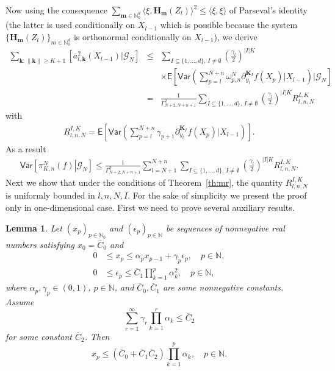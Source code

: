 \documentclass[bj]{imsart}
\newtheorem{lem}[thm]{Lemma}
\newcommand*{\ol}{\overline}
\begin{document}
Now using the consequence
$\sum_{\mathbf{m}\in \mathbb{N}^d_0} \langle\xi,\mathbf{H}_\mathbf{m}(Z_l)\rangle^2\le\langle\xi,\xi\rangle$
of Parseval's identity
(the latter is used conditionally on $X_{l-1}$
which is possible because the system
$\{\mathbf{H}_\mathbf{m}(Z_l)\}_{m\in \mathbb{N}^d_0}$
is orthonormal conditionally on $X_{l-1}$),
we derive
\begin{eqnarray*}
\sum_{\mathbf{k}\colon\|\mathbf{k}\|\geq K+1}\left[\bar{a}_{l,\mathbf{k}}^{2}(X_{l-1})|\mathcal{G}_{N}\right]
&\leq & \sum_{I\subseteq\{1,\ldots,d\},\, I\neq \emptyset}
\left(\frac{\gamma_{l}}{2}\right)^{|I|K}
\\
&& \times\mathsf E\left[
\mathsf{Var}\left(\sum_{p=l}^{N+n}\omega_{p,n}^{N}\partial_{y_{l}}^{\mathbf{K}_I}f\left(X_{p}\right)
\Big|X_{l-1}\right)
\Bigg|\mathcal G_N\right]
\\
&=& \frac{1}{\Gamma^2_{N+2,N+n+1}}\sum_{I\subseteq\{1,\ldots,d\},\, I\neq \emptyset}
\left(\frac{\gamma_{l}}{2}\right)^{|I|K}
R_{l,n,N}^{I,K}
\end{eqnarray*}
with
\begin{eqnarray*}
R_{l,n,N}^{I,K}=\mathsf E\left[
\mathsf{Var}\left(\sum_{p=l}^{N+n}\gamma_{p+1}\partial_{y_{l}}^{\mathbf{K}_I}f\left(X_{p}\right)
\Big|X_{l-1}\right)\right].
\end{eqnarray*}
As a result
\begin{eqnarray*}
\mathsf{Var}\left[\left.\pi_{K,n}^{N}(f)\right|\mathcal G_N\right]\leq \frac{1}{\Gamma^2_{N+2,N+n+1}}\sum_{l=N+1}^{N+n}\sum_{I\subseteq\{1,\ldots,d\},\, I\neq \emptyset}
\left(\frac{\gamma_{l}}{2}\right)^{|I|K}
R_{l,n,N}^{I,K}.
\end{eqnarray*}
Next we show that under the conditions  of Theorem~\ref{th:mr}, the quantity \(R_{l,n,N}^{I,K}\) is uniformly bounded in \(l,n,N,I.\) For the sake of simplicity we present the proof only in one-dimensional case. First we need to prove several auxiliary results.
\begin{lem}\label{lem:06062018a1}
Let $(x_p)_{p\in\mathbb N_0}$
and $(\epsilon_p)_{p\in\mathbb N}$
be sequences of nonnegative real numbers
satisfying $x_0=\ol C_0$ and
\begin{align}
0&\le x_p\le\alpha_p x_{p-1}+\gamma_p \epsilon_p,\quad p\in\mathbb N,
\label{eq:06062018a1}\\
0&\le\epsilon_p\le\ol C_1\prod_{k=1}^p \alpha_k^2,\quad p\in\mathbb N,
\label{eq:06062018a2}
\end{align}
where $\alpha_p,\gamma_p\in(0,1)$, $p\in\mathbb N$,
and $\ol C_0,\ol C_1$ are some nonnegative constants. Assume
\begin{equation}\label{eq:06062018a3}
\sum_{r=1}^\infty\gamma_r \prod_{k=1}^r \alpha_k\le\ol C_2
\end{equation}
for some constant $\ol C_2$. Then
$$
x_p\le(\ol C_0+\ol C_1\ol C_2)\prod_{k=1}^p \alpha_k,\quad p\in\mathbb N.
$$
\end{lem}
\end{document}
